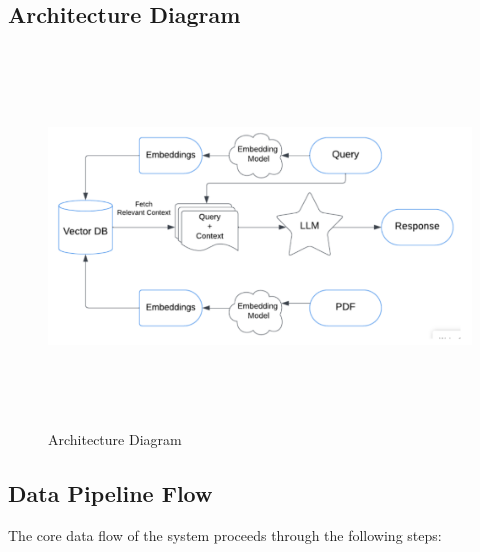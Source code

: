 \documentclass[12pt,a4paper]{report}
\begin{document}
\label{Architecture Diagram}
\subsection{Architecture Diagram}

\begin{figure}[H]
    \centering
    \includegraphics[width=15cm, height=10cm]{architectureDiagram}
    \caption{Architecture Diagram}
    \label{fig:ArchitectureDiagram}
\end{figure}






\label{Data Pipeline Flow}
\subsection{Data Pipeline Flow}

The core data flow of the system proceeds through the following steps:
\end{document}
